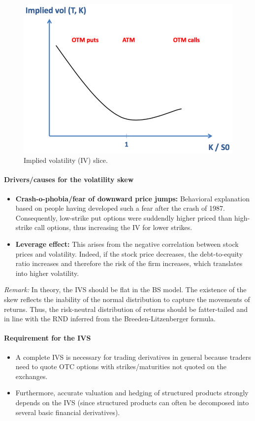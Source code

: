 \documentclass[a4paper,landscape,7pt,fleqn]{scrartcl}
\renewcommand{\emph}[1]{\textbf{#1}}
\begin{document}
\begin{multicols*}{3}
\begin{figure}[H]
\centering
\includegraphics[width=0.7 \linewidth]{IVslice}
\caption{Implied volatility (IV) slice.}
\end{figure}

\paragraph{Drivers/causes for the volatility skew}
\begin{itemize}
\item \emph{Crash-o-phobia/fear of downward price jumps:} Behavioral explanation based on people having developed such a fear after the crash of 1987. Consequently, low-strike put options were suddendly higher priced than high-strike call options, thus increasing the IV for lower strikes.
\item \emph{Leverage effect:} This arises from the negative correlation between stock prices and volatility. Indeed, if the stock price decreases, the debt-to-equity ratio increases and therefore the risk of the firm increases, which translates into higher volatility.
\end{itemize}
\textit{Remark:} In theory, the IVS should be flat in the BS model. The existence of the skew reflects the inability of the normal distribution to capture the movements of returns. Thus, the risk-neutral distribution of returns should be fatter-tailed and in line with the RND inferred from the Breeden-Litzenberger formula.

\paragraph{Requirement for the IVS}
\begin{itemize}
\item A complete IVS is necessary for trading derivatives in general because traders need to quote OTC options with strikes/maturities not quoted on the exchanges.
\item Furthermore, accurate valuation and hedging of structured products strongly depends on the IVS (since structured products can often be decomposed into several basic financial derivatives).
\end{itemize}


\end{multicols*}
\end{document}
